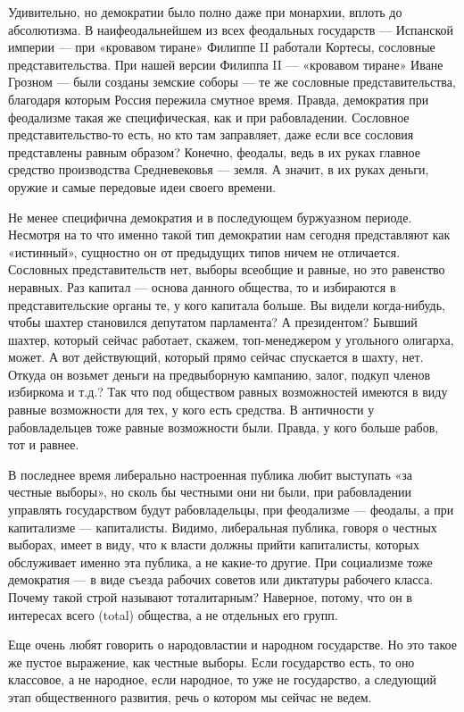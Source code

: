Удивительно, но демократии было полно даже при монархии, вплоть до абсолютизма.
В наифеодальнейшем из всех феодальных государств — Испанской империи — при
«кровавом тиране» Филиппе II работали Кортесы, сословные представительства. При
нашей версии Филиппа II — «кровавом тиране» Иване Грозном — были созданы
земские соборы — те же сословные представительства, благодаря которым Россия
пережила смутное время. Правда, демократия при феодализме такая же
специфическая, как и при рабовладении. Сословное представительство-то есть, но
кто там заправляет, даже если все сословия представлены равным образом?
Конечно, феодалы, ведь в их руках главное средство производства Средневековья —
земля. А значит, в их руках деньги, оружие и самые передовые идеи своего
времени.

Не менее специфична демократия и в последующем буржуазном периоде. Несмотря на
то что именно такой тип демократии нам сегодня представляют как «истинный»,
сущностно он от предыдущих типов ничем не отличается. Сословных
представительств нет, выборы всеобщие и равные, но это равенство неравных. Раз
капитал — основа данного общества, то и избираются в представительские органы
те, у кого капитала больше. Вы видели когда-нибудь, чтобы шахтер становился
депутатом парламента? А президентом? Бывший шахтер, который сейчас работает,
скажем, топ-менеджером у угольного олигарха, может. А вот действующий, который
прямо сейчас спускается в шахту, нет. Откуда он возьмет деньги на предвыборную
кампанию, залог, подкуп членов избиркома и т.д.? Так что под обществом равных
возможностей имеются в виду равные возможности для тех, у кого есть средства. В
античности у рабовладельцев тоже равные возможности были. Правда, у кого больше
рабов, тот и равнее.

В последнее время либерально настроенная публика любит выступать «за честные
выборы», но сколь бы честными они ни были, при рабовладении управлять
государством будут рабовладельцы, при феодализме — феодалы, а при капитализме —
капиталисты. Видимо, либеральная публика, говоря о честных выборах, имеет в
виду, что к власти должны прийти капиталисты, которых обслуживает именно эта
публика, а не какие-то другие. При социализме тоже демократия — в виде съезда
рабочих советов или диктатуры рабочего класса. Почему такой строй называют
тоталитарным? Наверное, потому, что он в интересах всего (total) общества, а не
отдельных его групп.

Еще очень любят говорить о народовластии и народном государстве. Но это такое
же пустое выражение, как честные выборы. Если государство есть, то оно
классовое, а не народное, если народное, то уже не государство, а следующий
этап общественного развития, речь о котором мы сейчас не ведем.

